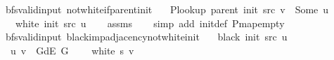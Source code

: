 \begin{isabellebody}
\endisatagproof
{\isafoldproof}%
%
\isadelimproof
\isanewline
%
\endisadelimproof
%
\isadeliminvisible
\isanewline
%
\endisadeliminvisible
%
\isataginvisible
{}\isamarkupfalse%
\ {\isacharparenleft}{\kern0pt}\ bfs{\isacharunderscore}{\kern0pt}valid{\isacharunderscore}{\kern0pt}input{\isacharparenright}{\kern0pt}\ not{\isacharunderscore}{\kern0pt}white{\isacharunderscore}{\kern0pt}if{\isacharunderscore}{\kern0pt}parent{\isacharunderscore}{\kern0pt}init{\isacharcolon}{\kern0pt}\isanewline
\ \ \ {\isachardoublequoteopen}P{\isacharunderscore}{\kern0pt}lookup\ {\isacharparenleft}{\kern0pt}parent\ {\isacharparenleft}{\kern0pt}init\ src{\isacharparenright}{\kern0pt}{\isacharparenright}{\kern0pt}\ v\ {\isacharequal}{\kern0pt}\ Some\ u{\isachardoublequoteclose}\isanewline
\ \ \ {\isachardoublequoteopen}{\isasymnot}\ white\ {\isacharparenleft}{\kern0pt}init\ src{\isacharparenright}{\kern0pt}\ u{\isachardoublequoteclose}%
\endisataginvisible
{\isafoldinvisible}%
%
\isadeliminvisible
\isanewline
%
\endisadeliminvisible
%
\isadelimproof
\ \ %
\endisadelimproof
%
\isatagproof
{}\isamarkupfalse%
\ assms\isanewline
\ \ \isamarkupfalse%
\ {\isacharparenleft}{\kern0pt}simp\ add{\isacharcolon}{\kern0pt}\ init{\isacharunderscore}{\kern0pt}def\ P{\isachardot}{\kern0pt}map{\isacharunderscore}{\kern0pt}empty{\isacharparenright}{\kern0pt}%
\endisatagproof
{\isafoldproof}%
%
\isadelimproof
\isanewline
%
\endisadelimproof
%
\isadeliminvisible
\isanewline
%
\endisadeliminvisible
%
\isataginvisible
{}\isamarkupfalse%
\ {\isacharparenleft}{\kern0pt}\ bfs{\isacharunderscore}{\kern0pt}valid{\isacharunderscore}{\kern0pt}input{\isacharparenright}{\kern0pt}\ black{\isacharunderscore}{\kern0pt}imp{\isacharunderscore}{\kern0pt}adjacency{\isacharunderscore}{\kern0pt}not{\isacharunderscore}{\kern0pt}white{\isacharunderscore}{\kern0pt}init{\isacharcolon}{\kern0pt}\isanewline
\ \ \ {\isachardoublequoteopen}black\ {\isacharparenleft}{\kern0pt}init\ src{\isacharparenright}{\kern0pt}\ u{\isachardoublequoteclose}\isanewline
\ \ \ {\isachardoublequoteopen}{\isacharparenleft}{\kern0pt}u{\isacharcomma}{\kern0pt}\ v{\isacharparenright}{\kern0pt}\ {\isasymin}\ G{\isachardot}{\kern0pt}dE\ G{\isachardoublequoteclose}\isanewline
\ \ \ {\isachardoublequoteopen}{\isasymnot}\ white\ s\ v{\isachardoublequoteclose}%
\endisataginvisible
{\isafoldinvisible}%
%
\isadeliminvisible
\isanewline
%
\endisadeliminvisible
%
\isadelimproof

\end{isabellebody}
